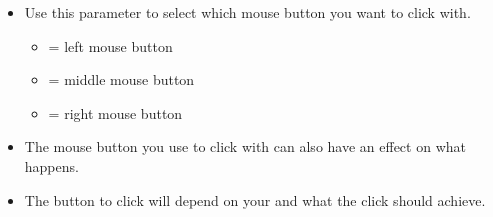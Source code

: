 \begin{itemize}
\item Use this parameter to select which mouse button you want to click with.
\begin{itemize}
\item {} = left mouse button
\item {} = middle mouse button
\item {} = right mouse button
\end{itemize}
\item The mouse button you use to click with can also have an effect on what happens. 
\item The button to click will depend on your \gdaut{} and what the click should achieve.
\end{itemize}

